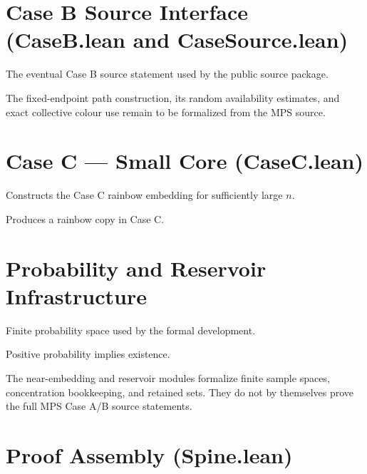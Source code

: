 \chapter{Case B Source Interface (CaseB.lean and CaseSource.lean)}

\begin{definition}\label{def:caseB_source}
The eventual Case B source statement used by the public source package.
\end{definition}

The fixed-endpoint path construction, its random availability estimates, and exact collective
colour use remain to be formalized from the MPS source.

\chapter{Case C --- Small Core (CaseC.lean)}

\begin{lemma}\label{lem:caseC_embedding_exists}
\leanok
Constructs the Case C rainbow embedding for sufficiently large $n$.
\end{lemma}

\begin{theorem}\label{thm:caseC_rainbow}
\leanok
Produces a rainbow copy in Case C.
\end{theorem}

\chapter{Probability and Reservoir Infrastructure}

\begin{definition}\label{def:prob_event}
\leanok
Finite probability space used by the formal development.
\end{definition}

\begin{lemma}\label{lem:exists_of_prob_gt_zero}
\leanok
Positive probability implies existence.
\end{lemma}

The near-embedding and reservoir modules formalize finite sample spaces, concentration
bookkeeping, and retained sets. They do not by themselves prove the full MPS Case A/B source
statements.

\chapter{Proof Assembly (Spine.lean)}

